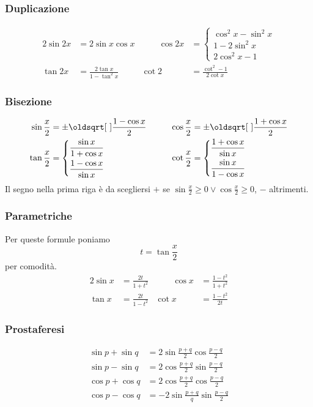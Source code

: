 \subsubsection{Duplicazione}
\begin{alignat*}{2}
  \sin2x & =2\sin x\cos x &\qquad \cos2x &= \begin{cases}
    \cos^2x - \sin^2x\\
    1-2\sin^2x\\
    2\cos^2x-1
  \end{cases}\\
  \tan2x &= \frac{2\tan x}{1-\tan^2x} & \cot2 &= \frac{\cot^2-1}{2\cot x}
\end{alignat*}

\subsubsection{Bisezione}
\begin{alignat*}{2}
  \sin\frac{x}{2}&=\pm\sqrt{\frac{1-\cos x}{2}} &\qquad \cos\frac{x}{2}&=\pm\sqrt{\frac{1+\cos x}{2}}\\
  \tan\frac{x}{2}&=\begin{dcases}
    \frac{\sin x}{1+\cos x}\\
    \frac{1-\cos x}{\sin x}
  \end{dcases} & \cot\frac{x}{2} &= \begin{dcases}
    \frac{1+\cos x}{\sin x}\\
    \frac{\sin x}{1-\cos x}
  \end{dcases}
\end{alignat*}
Il segno nella prima riga è da scegliersi $+$ se 
$\sin\frac{x}{2}\geq0\lor\cos\frac{x}{2}\geq0$, $-$ altrimenti.

\subsubsection{Parametriche}
Per queste formule poniamo
\begin{equation*}
  t = \tan\frac{x}{2}
\end{equation*}
per comodità.
\begin{alignat*}{2}
  \sin x &= \frac{2t}{1+t^2} &\qquad \cos x &= \frac{1-t^2}{1+t^2}\\
  \tan x &= \frac{2t}{1-t^2} & \cot x &= \frac{1-t^2}{2t}
\end{alignat*}

\subsubsection{Prostaferesi}
\begin{align*}
  \sin p + \sin q &= 2\sin\frac{p+q}{2}\cos\frac{p-q}{2}\\
  \sin p-\sin q &=2\cos\frac{p+q}{2}\sin\frac{p-q}{2}\\
  \cos p+\cos q&=2\cos\frac{p+q}{2}\cos\frac{p-q}{2}\\
  \cos p-\cos q&=-2\sin\frac{p+q}{q}\sin\frac{p-q}{2}
\end{align*}

